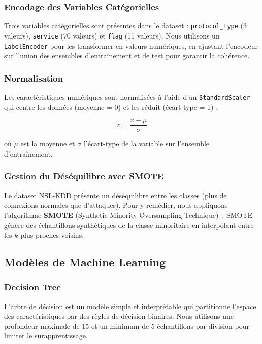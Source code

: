 \documentclass[12pt,a4paper]{article}
\begin{document}
\subsubsection{Encodage des Variables Catégorielles}

Trois variables catégorielles sont présentes dans le dataset : \texttt{protocol\_type} (3 valeurs), \texttt{service} (70 valeurs) et \texttt{flag} (11 valeurs). Nous utilisons un \texttt{LabelEncoder} pour les transformer en valeurs numériques, en ajustant l'encodeur sur l'union des ensembles d'entraînement et de test pour garantir la cohérence.

\subsubsection{Normalisation}

Les caractéristiques numériques sont normalisées à l'aide d'un \texttt{StandardScaler} qui centre les données (moyenne = 0) et les réduit (écart-type = 1) :

\begin{equation}
    z = \frac{x - \mu}{\sigma}
\end{equation}

où $\mu$ est la moyenne et $\sigma$ l'écart-type de la variable sur l'ensemble d'entraînement.

\subsubsection{Gestion du Déséquilibre avec SMOTE}

Le dataset NSL-KDD présente un déséquilibre entre les classes (plus de connexions normales que d'attaques). Pour y remédier, nous appliquons l'algorithme \textbf{SMOTE} (Synthetic Minority Oversampling Technique)~\cite{chawla2002}. SMOTE génère des échantillons synthétiques de la classe minoritaire en interpolant entre les $k$ plus proches voisins.

\subsection{Modèles de Machine Learning}

\subsubsection{Decision Tree}

L'arbre de décision est un modèle simple et interprétable qui partitionne l'espace des caractéristiques par des règles de décision binaires. Nous utilisons une profondeur maximale de 15 et un minimum de 5 échantillons par division pour limiter le surapprentissage.
\end{document}
